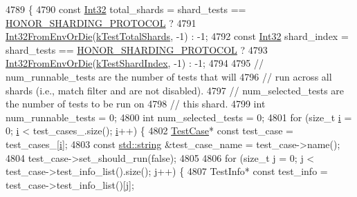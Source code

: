\begin{DoxyCode}
4789                                                             \{
4790   \textcolor{keyword}{const} \hyperlink{namespacetesting_1_1internal_a8ee38faaf875f133358abaf9bc056cec}{Int32} total\_shards = shard\_tests == \hyperlink{classtesting_1_1internal_1_1UnitTestImpl_acc5ffd3f9bc2e87bb3dba4218f58af43abec11f1c4bb8a3e2b99fa8328bccd58c}{HONOR\_SHARDING\_PROTOCOL} ?
4791       \hyperlink{namespacetesting_1_1internal_aaa576613655c2f380278c255c3ec5fef}{Int32FromEnvOrDie}(\hyperlink{namespacetesting_a7542311baba200ebabd4065717606f6e}{kTestTotalShards}, -1) : -1;
4792   \textcolor{keyword}{const} \hyperlink{namespacetesting_1_1internal_a8ee38faaf875f133358abaf9bc056cec}{Int32} shard\_index = shard\_tests == \hyperlink{classtesting_1_1internal_1_1UnitTestImpl_acc5ffd3f9bc2e87bb3dba4218f58af43abec11f1c4bb8a3e2b99fa8328bccd58c}{HONOR\_SHARDING\_PROTOCOL} ?
4793       \hyperlink{namespacetesting_1_1internal_aaa576613655c2f380278c255c3ec5fef}{Int32FromEnvOrDie}(\hyperlink{namespacetesting_a5f76dfdb8cb2664da54e320ecaba3643}{kTestShardIndex}, -1) : -1;
4794 
4795   \textcolor{comment}{// num\_runnable\_tests are the number of tests that will}
4796   \textcolor{comment}{// run across all shards (i.e., match filter and are not disabled).}
4797   \textcolor{comment}{// num\_selected\_tests are the number of tests to be run on}
4798   \textcolor{comment}{// this shard.}
4799   \textcolor{keywordtype}{int} num\_runnable\_tests = 0;
4800   \textcolor{keywordtype}{int} num\_selected\_tests = 0;
4801   \textcolor{keywordflow}{for} (\textcolor{keywordtype}{size\_t} \hyperlink{gtest__output__test__golden__lin_8txt_a7e98b8a17c0aad30ba64d47b74e2a6c1}{i} = 0; \hyperlink{gtest__output__test__golden__lin_8txt_a7e98b8a17c0aad30ba64d47b74e2a6c1}{i} < test\_cases\_.size(); \hyperlink{gtest__output__test__golden__lin_8txt_a7e98b8a17c0aad30ba64d47b74e2a6c1}{i}++) \{
4802     \hyperlink{namespacegmock__test__utils_a959c5af591e4d49b6d35745205b64509}{TestCase}* \textcolor{keyword}{const} test\_case = test\_cases\_[\hyperlink{gtest__output__test__golden__lin_8txt_a7e98b8a17c0aad30ba64d47b74e2a6c1}{i}];
4803     \textcolor{keyword}{const} \hyperlink{namespacetesting_1_1internal_a8e8ff5b11e64078831112677156cb111}{std::string} &test\_case\_name = test\_case->name();
4804     test\_case->set\_should\_run(\textcolor{keyword}{false});
4805 
4806     \textcolor{keywordflow}{for} (\textcolor{keywordtype}{size\_t} j = 0; j < test\_case->test\_info\_list().size(); j++) \{
4807       TestInfo* \textcolor{keyword}{const} test\_info = test\_case->test\_info\_list()[j];

\end{DoxyCode}
